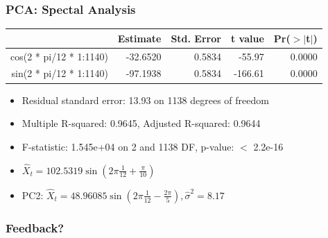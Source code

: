 \documentclass{beamer}
\begin{document}
\begin{frame}
\frametitle{PCA: Spectal Analysis}
\begin{table}[ht]
\centering
\begin{tabular}{rrrrr}
\hline
& Estimate & Std. Error & t value & Pr($>$$|$t$|$) \\ 
\hline
cos(2 * pi/12 * 1:1140) & -32.6520 & 0.5834 & -55.97 & 0.0000 \\ 
sin(2 * pi/12 * 1:1140) & -97.1938 & 0.5834 & -166.61 & 0.0000 \\ 
\hline
\end{tabular}
\end{table}
\begin{itemize}
\item Residual standard error: 13.93 on 1138 degrees of freedom
\item Multiple R-squared:  0.9645,	Adjusted R-squared:  0.9644 
\item F-statistic: 1.545e+04 on 2 and 1138 DF,  p-value: $<$ 2.2e-16
\item $\hat{X}_t = 102.5319\sin(2\pi\frac{1}{12} + \frac{\pi}{10})$ %
\item PC2: $\hat{X}_t = 48.96085\sin(2\pi\frac{1}{12}-\frac{2\pi}{5} ), \hat{\sigma}^2 = 8.17$ %
\end{itemize}
\end{frame}

\begin{frame}
\frametitle{Feedback?}
\end{frame}
\end{document}
